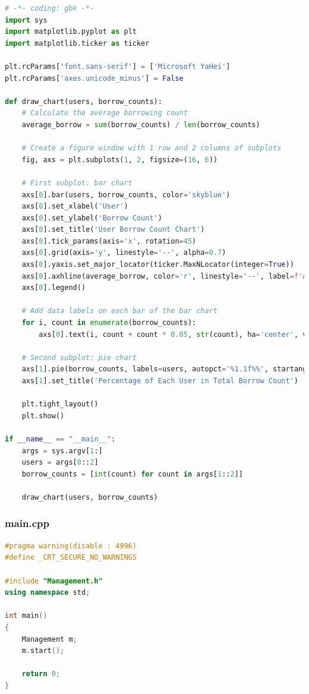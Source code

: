 \documentclass[12pt,twoside]{ctexart}
\begin{document}
\begin{lstlisting}[language=Python]
# -*- coding: gbk -*-
import sys
import matplotlib.pyplot as plt
import matplotlib.ticker as ticker

plt.rcParams['font.sans-serif'] = ['Microsoft YaHei']
plt.rcParams['axes.unicode_minus'] = False

def draw_chart(users, borrow_counts):
    # Calculate the average borrowing count
    average_borrow = sum(borrow_counts) / len(borrow_counts)
    
    # Create a figure window with 1 row and 2 columns of subplots
    fig, axs = plt.subplots(1, 2, figsize=(16, 6))
    
    # First subplot: bar chart
    axs[0].bar(users, borrow_counts, color='skyblue')
    axs[0].set_xlabel('User')
    axs[0].set_ylabel('Borrow Count')
    axs[0].set_title('User Borrow Count Chart')
    axs[0].tick_params(axis='x', rotation=45)
    axs[0].grid(axis='y', linestyle='--', alpha=0.7)
    axs[0].yaxis.set_major_locator(ticker.MaxNLocator(integer=True))
    axs[0].axhline(average_borrow, color='r', linestyle='--', label=f'Average Borrow Count: {average_borrow:.2f}')
    axs[0].legend()
    
    # Add data labels on each bar of the bar chart
    for i, count in enumerate(borrow_counts):
        axs[0].text(i, count + count * 0.05, str(count), ha='center', va='bottom')
    
    # Second subplot: pie chart
    axs[1].pie(borrow_counts, labels=users, autopct='%1.1f%%', startangle=140)
    axs[1].set_title('Percentage of Each User in Total Borrow Count')
    
    plt.tight_layout()
    plt.show()

if __name__ == "__main__":
    args = sys.argv[1:]
    users = args[0::2]
    borrow_counts = [int(count) for count in args[1::2]]

    draw_chart(users, borrow_counts)
\end{lstlisting}

\newpage
\subsubsection{main.cpp}

\begin{lstlisting}[language=C++]
#pragma warning(disable : 4996)
#define _CRT_SECURE_NO_WARNINGS

#include "Management.h"
using namespace std;

int main()
{
    Management m;
    m.start();

    return 0;
}
\end{lstlisting}
\end{document}
